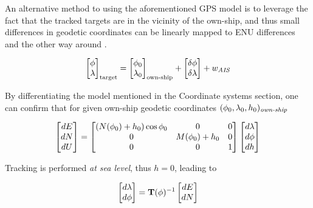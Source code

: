 An alternative method to using the aforementioned GPS model is to leverage the fact that the tracked targets are in the vicinity of the own-ship, and thus small differences in geodetic coordinates can be linearly mapped to ENU differences and the other way around \cite{Wellenhof1997}.



\begin{equation}
	\begin{bmatrix}
		{\phi}\\ {\lambda}
		\end{bmatrix}_{\text{target}}=
		\begin{bmatrix}
		{\phi}_{0}\\ {\lambda}_{0}
	\end{bmatrix}_{\text{own-ship}} + \begin{bmatrix}
	\delta{\phi} \\ \delta{\lambda}
	\end{bmatrix} + {w}_{\textit{AIS}}
\end{equation}


By differentiating the model mentioned in the Coordinate systems section, one can confirm that for given own-ship geodetic coordinates $({\phi}_0,{\lambda}_0, h_0)_{\textit{own-ship}}$



\begin{equation}
\label{eq:ENUgeodifferences}
\begin{bmatrix}
dE\\dN\\dU
\end{bmatrix}=
\begin{bmatrix}
(N({\phi}_0)+h_0)\cos{\phi}_0 &0 &0\\
0 &M({\phi}_0) + h_0 &0\\
0 &0 &1
\end{bmatrix}
\begin{bmatrix}
d{\lambda}\\d{\phi}\\dh
\end{bmatrix}
\end{equation}


Tracking is performed \emph{at sea level}, thus $h=0$, leading to


\begin{equation}
\begin{bmatrix}
d{\lambda}\\ d{\phi}
\end{bmatrix}=
\mathbf{T}({\phi})^{-1}
\begin{bmatrix}
dE\\ dN
\end{bmatrix}
\end{equation}




